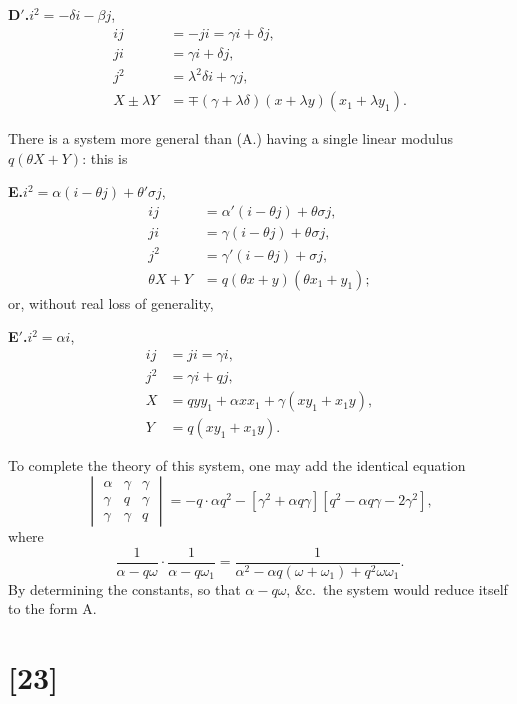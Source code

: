 \documentclass[12pt,a4paper]{article}
\begin{document}
\medskip
\textbf{D$'$.}\quad $i^2 = -\delta i - \beta j$,
\begin{align*}
ij &= -ji = \gamma i + \delta j,\\
ji &= \gamma i + \delta j,\\
j^2 &= \lambda^2\delta i + \gamma j,\\
X \pm \lambda Y &= \mp (\gamma + \lambda\delta)(x + \lambda y)(x_1 + \lambda y_1).
\end{align*}

There is a system more general than (A.) having a single linear modulus $q(\theta X + Y)$:
this is

\medskip
\textbf{E.}\quad $i^2 = \alpha(i - \theta j) + \theta'\sigma j$,
\begin{align*}
ij &= \alpha'(i - \theta j) + \theta\sigma j,\\
ji &= \gamma(i - \theta j) + \theta\sigma j,\\
j^2 &= \gamma'(i - \theta j) + \sigma j,\\
\theta X + Y &= q(\theta x + y)(\theta x_1 + y_1);
\end{align*}
or, without real loss of generality,

\newpage
\setcounter{page}{131}

\medskip
\textbf{E$'$.}\quad $i^2 = \alpha i$,
\begin{align*}
ij &= ji = \gamma i,\\
j^2 &= \gamma i + q j,\\
X &= q y y_1 + \alpha x x_1 + \gamma(xy_1 + x_1y),\\
Y &= q(xy_1 + x_1y).
\end{align*}

To complete the theory of this system, one may add the identical equation
\[
\begin{vmatrix}
\alpha & \gamma & \gamma \\
\gamma & q & \gamma \\
\gamma & \gamma & q
\end{vmatrix}
= -q \cdot \alpha q^2 - [\gamma^2 + \alpha q\gamma] [q^2 - \alpha q\gamma - 2\gamma^2],
\]
where
\[
\frac{1}{\alpha - q\omega} \cdot \frac{1}{\alpha - q\omega_1} = \frac{1}{\alpha^2 - \alpha q(\omega + \omega_1) + q^2 \omega\omega_1}.
\]
By determining the constants, so that $\alpha - q\omega$, \&c.\ the system would
reduce itself to the form A.

\newpage
\section*{[23]}
\end{document}
